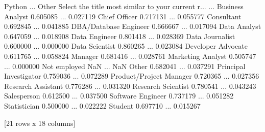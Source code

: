\documentclass[letterpaper,10pt,english]{jupyterBook}
\begin{document}
\begin{sphinxVerbatim}[commandchars=\\\{\}]
  
   \PYG{p}{[}\PYG{p}{[}\PYG{p}{[}\PYG{p}{]}\PYG{p}{]}\PYG{p}{]}\PYG{p}{[}\PYG{p}{]}\PYG{p}{[}\PYG{p}{]}
\end{sphinxVerbatim}

\begin{sphinxVerbatim}[commandchars=\\\{\}]
\end{sphinxVerbatim}

\begin{sphinxVerbatim}[commandchars=\\\{\}]
                                                      Python  ...     Other
Select the title most similar to your current r...            ...          
Business Analyst                                    0.605085  ...  0.027119
Chief Officer                                       0.717131  ...  0.055777
Consultant                                          0.692845  ...  0.041885
DBA/Database Engineer                               0.666667  ...  0.017094
Data Analyst                                        0.647059  ...  0.018908
Data Engineer                                       0.801418  ...  0.028369
Data Journalist                                     0.600000  ...  0.000000
Data Scientist                                      0.860265  ...  0.023084
Developer Advocate                                  0.611765  ...  0.058824
Manager                                             0.681416  ...  0.028761
Marketing Analyst                                   0.505747  ...  0.000000
Not employed                                             NaN  ...       NaN
Other                                               0.682041  ...  0.037291
Principal Investigator                              0.759036  ...  0.072289
Product/Project Manager                             0.720365  ...  0.027356
Research Assistant                                  0.776286  ...  0.031320
Research Scientist                                  0.780541  ...  0.043243
Salesperson                                         0.612500  ...  0.037500
Software Engineer                                   0.737179  ...  0.051282
Statistician                                        0.500000  ...  0.022222
Student                                             0.697710  ...  0.015267

[21 rows x 18 columns]
\end{sphinxVerbatim}
\end{document}
